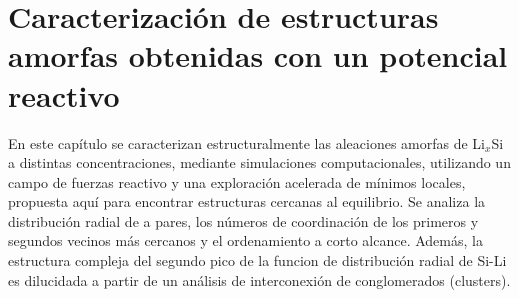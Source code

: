 \chapter{Caracterización de estructuras amorfas obtenidas con un potencial 
reactivo}\label{ch:caracterizacion}
\thispagestyle{empty}

\vspace{50pt}

\begin{adjustwidth}{50pt}{50pt}
    En este capítulo se caracterizan estructuralmente las aleaciones amorfas de
    Li$_x$Si a distintas concentraciones, mediante simulaciones computacionales,
    utilizando un campo de fuerzas reactivo y una exploración acelerada de mínimos
    locales, propuesta aquí para encontrar estructuras cercanas al equilibrio. Se
    analiza la distribución radial de a pares, los números de coordinación de los
    primeros y segundos vecinos más cercanos y el ordenamiento a corto alcance.
    Además, la estructura compleja del segundo pico de la funcion de distribución radial de Si-Li es 
    dilucidada a partir de un análisis de interconexión de conglomerados (clusters).
\end{adjustwidth}

\clearpage
\newpage
\thispagestyle{empty}
\mbox{}
\newpage








